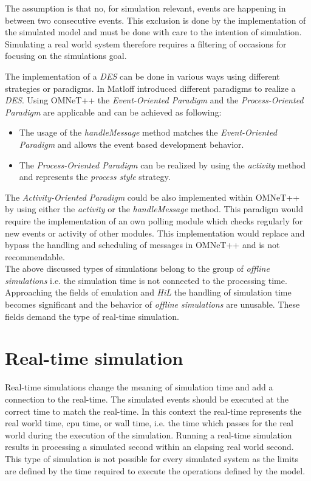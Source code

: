 The assumption is that no, for simulation relevant, events are happening in between two consecutive events.
This exclusion is done by the implementation of the simulated model and must be done with care to the intention of simulation.
Simulating a real world system therefore requires a filtering of occasions for focusing on the simulations goal. \cite[section 4.1.1]{omnet_manual}

The implementation of a \emph{DES} can be done in various ways using different strategies or paradigms.
In \cite[chapter 2]{matloff_introduction_2008} Matloff introduced different paradigms to realize a \emph{DES}.
Using OMNeT++ the \emph{Event-Oriented Paradigm} and the \emph{Process-Oriented Paradigm} are applicable and can be achieved as following:

\begin{itemize}
    \item The usage of the \emph{handleMessage} method matches the \emph{Event-Oriented Paradigm} and allows the event based development behavior.
    \item The \emph{Process-Oriented Paradigm} can be realized by using the \emph{activity} method and represents the \emph{process style} strategy.
\end{itemize}

The \emph{Activity-Oriented Paradigm} could be also implemented within OMNeT++ by using either the \emph{activity} or the \emph{handleMessage} method.
This paradigm would require the implementation of an own polling module which checks regularly for new events or activity of other modules.
This implementation would replace and bypass the handling and scheduling of messages in OMNeT++ and is not recommendable. \cite[chapter 2.1]{matloff_introduction_2008}
\\

The above discussed types of simulations belong to the group of \emph{offline simulations} i.e. the simulation time is not connected to the processing time.
Approaching the fields of emulation and \emph{HiL} the handling of simulation time becomes significant and the behavior of \emph{offline simulations} are unusable.
These fields demand the type of real-time simulation.  \cite[section III.B]{belanger_what_2010}

\section{Real-time simulation}
\label{sec:simulation_real_time}
Real-time simulations change the meaning of simulation time and add a connection to the real-time.
The simulated events should be executed at the correct time to match the real-time.
In this context the real-time represents the real world time, cpu time, or wall time, i.e. the time which passes for the real world during the execution of the simulation.
Running a real-time simulation results in processing a simulated second within an elapsing real world second.
This type of simulation is not possible for every simulated system as the limits are defined by the time required to execute the operations defined by the model.

